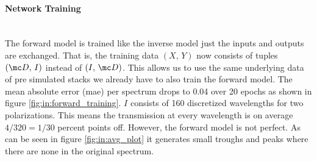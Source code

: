 \paragraph{Network Training}~\\
The forward model is trained like the inverse model just the inputs and outputs are exchanged. That is, the training data $(X,\, Y)$ now consists of tuples 
$(\mc D,\, I)$ instead of $(I,\, \mc D)$. This allows us to use the same underlying data of pre simulated stacks we already have to also train the forward model. 
The mean absolute error (mae) per spectrum drops to 0.04 over 20 epochs as shown in figure \ref{fig:in:forward_training}. $I$ consists of 160 discretized wavelengths for two polarizations. This means the transmission at every wavelength is on average $4/320 = 1/30$ percent points off. However, the forward model is not perfect. As can be seen in figure \ref{fig:in:avg_plot} it generates small troughs and peaks where there are none in the original spectrum.